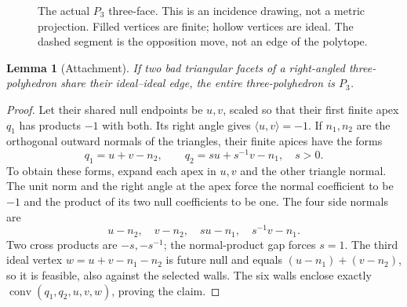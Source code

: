 \documentclass[11pt]{article}
\newtheorem{lemma}[theorem]{Lemma}
\theoremstyle{definition}\newtheorem{definition}[theorem]{Definition}
\theoremstyle{remark}\newtheorem{remark}[theorem]{Remark}
\newcommand{\ip}[2]{\langle #1,#2\rangle}
\newcommand{\Pthree}{P_3}
\begin{document}
\begin{figure}[ht]
\centering
{}
\caption{The actual \(\Pthree\) three-face. This is an incidence drawing,
not a metric projection. Filled vertices are finite; hollow vertices
are ideal. The dashed segment is the opposition move, not an edge of
the polytope.}
\label{fig:P3}
\end{figure}

\begin{lemma}[Attachment]\label{lem:attachment}
If two bad triangular facets of a right-angled three-polyhedron share
their ideal--ideal edge, the entire three-polyhedron is \(\Pthree\).
\end{lemma}
\begin{proof}
Let their shared null endpoints be \(u,v\), scaled so that their first
finite apex \(q_1\) has products \(-1\) with both. Its right angle gives
\(\ip{u}{v}=-1\). If \(n_1,n_2\) are the orthogonal outward normals of
the triangles, their finite apices have the forms
\[
 q_1=u+v-n_2,\qquad q_2=s u+s^{-1}v-n_1,\quad s>0.
\]
To obtain these forms, expand each apex in \(u,v\) and the other
triangle normal. The unit norm and the right angle at the apex force
the normal coefficient to be \(-1\) and the product of its two null
coefficients to be one. The four side normals are
\[
 u-n_2,\quad v-n_2,\quad su-n_1,\quad s^{-1}v-n_1.
\]
Two cross products are \(-s,-s^{-1}\); the normal-product gap forces
\(s=1\). The third ideal vertex \(w=u+v-n_1-n_2\) is future null
and equals \((u-n_1)+(v-n_2)\), so it is feasible, also against
the selected walls. The six walls enclose exactly
\(\operatorname{conv}(q_1,q_2,u,v,w)\), proving the claim.
\end{proof}
\end{document}
